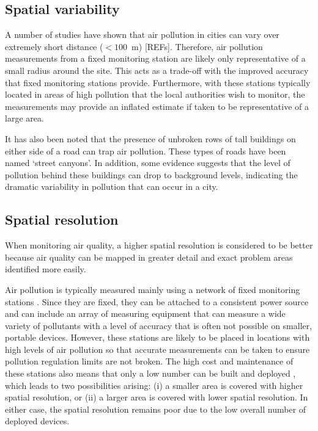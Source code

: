 \documentclass[11pt]{report}
\begin{document}
\begin{landscape}
\end{landscape}


\subsection{Spatial variability}

A number of studies have shown that air pollution in cities can vary over extremely short distance ($ < 100$~m) [REFs]. Therefore, air pollution measurements from a fixed monitoring station are likely only representative of a small radius around the site. This acts as a trade-off with the improved accuracy that fixed monitoring stations provide. Furthermore, with these stations typically located in areas of high pollution that the local authorities wish to monitor, the measurements may provide an inflated estimate if taken to be representative of a large area.

It has also been noted that the presence of unbroken rows of tall buildings on either side of a road can trap air pollution. These types of roads have been named `street canyons'. In addition, some evidence suggests that the level of pollution behind these buildings can drop to background levels, indicating the dramatic variability in pollution that can occur in a city.

\subsection{Spatial resolution} \label{spatialres}

When monitoring air quality, a higher spatial resolution is considered to be better because air quality can be mapped in greater detail and exact problem areas identified more easily.

Air pollution is typically measured mainly using a network of fixed monitoring stations \citep{Adams2012hamilton20052010}. Since they are fixed, they can be attached to a consistent power source and can include an array of measuring equipment that can measure a wide variety of pollutants with a level of accuracy that is often not possible on smaller, portable devices. However, these stations are likely to be placed in locations with high levels of air pollution \citep{Kanaroglou2005location} so that accurate measurements can be taken to ensure pollution regulation limits are not broken. The high cost and maintenance of these stations also means that only a low number can be built and deployed \citep{Devarakonda2013}, which leads to two possibilities arising: (i) a smaller area is covered with higher spatial resolution, or (ii) a larger area is covered with lower spatial resolution. In either case, the spatial resolution remains poor due to the low overall number of deployed devices.
\end{document}
